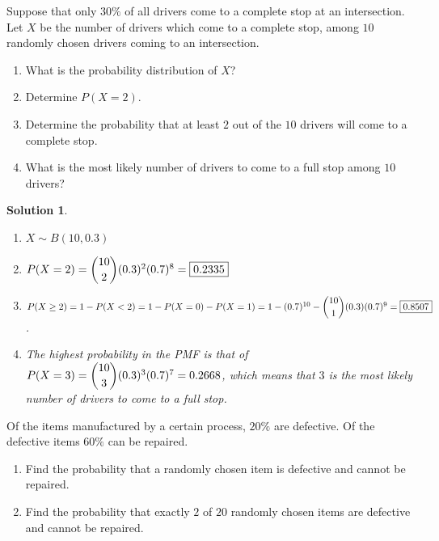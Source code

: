 \documentclass[11pt]{article}
\newtheorem*{solution}{Solution}
\theoremstyle{mystyle}
\begin{document}
\begin{psproblem}{}{}
    Suppose that only $30\%$ of all drivers come to a complete stop at an intersection. Let $X$ be the number of drivers
    which come to a complete stop, among $10$ randomly chosen drivers coming to an intersection.
    \begin{enumerate}[label=\alph*.]
        \item What is the probability distribution of $X$?
        \item Determine $P(X = 2)$.
        \item Determine the probability that at least $2$ out of the $10$ drivers will come to a complete stop.
        \item What is the most likely number of drivers to come to a full stop among $10$ drivers?
    \end{enumerate}
\end{psproblem}

\begin{solution}
    \leavevmode
    \begin{enumerate}[label=\alph*.]
        \item $X \sim B(10, 0.3)$
        \item $P(X = 2) = \dbinom{10}{2} (0.3)^2 (0.7)^8 = \boxed{0.2335}$
        \item $P(X \ge 2) = 1 - P(X < 2) = 1 - P(X = 0) - P(X = 1) = 1 - (0.7)^{10} - \dbinom{10}{1} (0.3)(0.7)^9 = \boxed{0.8507}$.
        \item The highest probability in the PMF is that of $P(X=3)=\dbinom{10}{3} (0.3)^3(0.7)^7 = 0.2668$,
        which means that $\boxed{3}$ is the most likely number of drivers to come to a full stop.
    \end{enumerate}
\end{solution}

\begin{psproblem}{}{}
    Of the items manufactured by a certain process, $20\%$ are defective. Of the defective items $60\%$ can be repaired.
    \begin{enumerate}[label=\alph*.]
        \item Find the probability that a randomly chosen item is defective and cannot be repaired.
        \item Find the probability that exactly $2$ of $20$ randomly chosen items are defective and cannot be repaired.
    \end{enumerate}
\end{psproblem}
\end{document}
